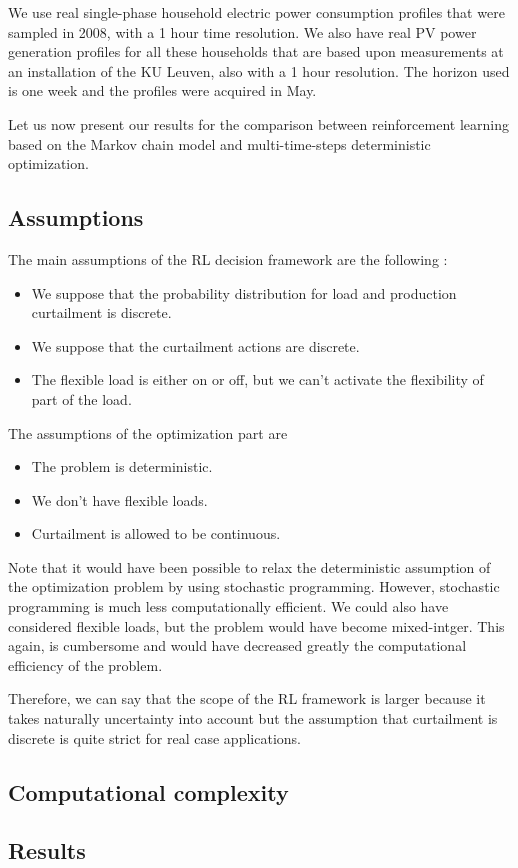 

We use real single-phase household electric power consumption profiles that were sampled in 2008, with a 1 hour time resolution.
We also have real PV power generation profiles for all these households that are based upon measurements at an installation of the KU Leuven, also with a 1 hour resolution.
The horizon used is one week and the profiles were acquired in May.

Let us now present our results for the comparison between reinforcement learning based on the Markov chain model and multi-time-steps deterministic optimization.

\subsection{Assumptions}

The main assumptions of the RL decision framework are the following :
\begin{itemize}
\item We suppose that the probability distribution for load and production curtailment is discrete.
\item We suppose that the curtailment actions are discrete.
\item The flexible load is either on or off, but we can't activate the flexibility of part of the load.
\end{itemize}

The assumptions of the optimization part are
\begin{itemize}
\item The problem is deterministic.
\item We don't have flexible loads.
\item Curtailment is allowed to be continuous.
\end{itemize}

Note that it would have been possible to relax the deterministic assumption of the optimization problem by using stochastic programming.
However, stochastic programming is much less computationally efficient.
We could also have considered flexible loads, but the problem would have become mixed-intger.
This again, is cumbersome and would have decreased greatly the computational efficiency of the problem.

Therefore, we can say that the scope of the RL framework is larger because it takes naturally uncertainty into account but the assumption that curtailment is discrete is quite strict for real case applications. 

\subsection{Computational complexity}

\subsection{Results}
